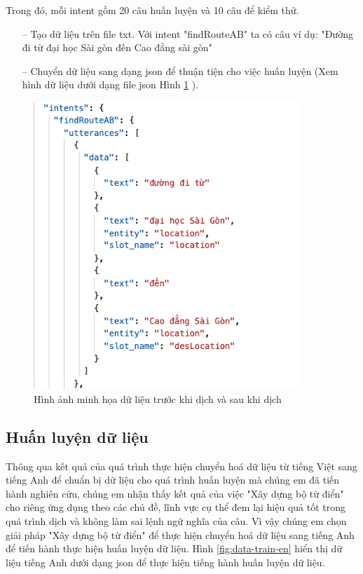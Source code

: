 Trong đó, mỗi intent gồm 20 câu huấn luyện và 10 câu để kiểm thử.

\begin{itemize}
    \item[--] Tạo dữ liệu trên file txt. Với intent "findRouteAB" ta có câu ví dụ: "Đường đi từ đại học Sài gòn đến Cao đẳng sài gòn"
    \item[--] Chuyển dữ liệu sang dạng json để thuận tiện cho việc huấn luyện (Xem hình dữ liệu dưới dạng file json Hình \ref{fig:data-train-json} ).
\end{itemize}
\begin{figure}[H]
    \centering
    \includegraphics[width=10cm]{images/Data-train-json.png}
    \caption{Hình ảnh minh họa dữ liệu trước khi dịch và sau khi dịch}
    \label{fig:data-train-json}
\end{figure}

\subsection{Huấn luyện dữ liệu}

Thông qua kết quả của quá trình thực hiện chuyển hoá dữ liệu từ tiếng Việt sang tiếng Anh để chuẩn bị dữ liệu cho quá trình huấn luyện mà chúng em đã tiến hành nghiên cứu, chúng em nhận thấy kết quả của việc "Xây dựng bộ từ điển" cho riêng ứng dụng theo các chủ đề, lĩnh vực cụ thể đem lại hiệu quả tốt trong quá trình dịch và không làm sai lệnh ngữ nghĩa của câu. Vì vậy chúng em chọn giải pháp "Xây dựng bộ từ điển" để thực hiện chuyển hoá dữ liệu sang tiếng Anh để tiến hành thực hiện huấn luyện dữ liệu. Hình \ref{fig:data-train-en} hiển thị dữ liệu tiếng Anh dưới dạng json để thực hiện tiếng hành huấn luyện dữ liệu.

